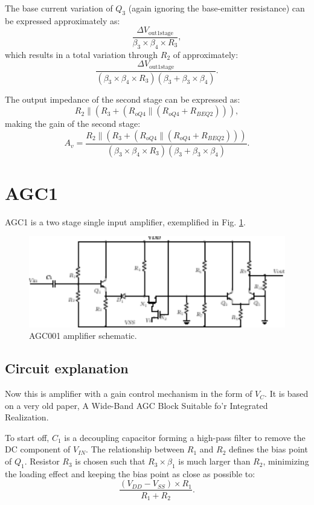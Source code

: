 \documentclass[12pt]{article}
\begin{document}
The base current variation of $Q_3$ (again ignoring the base-emitter resistance) can be expressed approximately as:  
\[
\frac{\Delta V_{\text{out1stage}}}{\beta_3 \times \beta_4 \times R_3},
\]  
which results in a total variation through $R_2$ of approximately:  
\[
\frac{\Delta V_{\text{out1stage}}}{(\beta_3 \times \beta_4 \times R_3)(\beta_3 + \beta_3 \times \beta_4)}.
\]  

The output impedance of the second stage can be expressed as:  
\[
R_2 \parallel \left(R_3 + \left(R_{oQ4} \parallel \left(R_{oQ4} + R_{BEQ2}\right)\right)\right),
\]  
making the gain of the second stage:  
\[
A_v = \frac{R_2 \parallel \left(R_3 + \left(R_{oQ4} \parallel \left(R_{oQ4} + R_{BEQ2}\right)\right)\right)}{(\beta_3 \times \beta_4 \times R_3)(\beta_3 + \beta_3 \times \beta_4)}.
\]


\section{AGC1}

AGC1 is a  two stage single input amplifier, exemplified in Fig. \ref{audio004}. 
\begin{figure}[H]
        \centering
        \includegraphics[width=1\textwidth]{audio004.pdf}
        \caption{AGC001 amplifier schematic.}
        \label{audio004}
\end{figure}
\subsection{Circuit explanation}
Now this is amplifier with a gain control mechanism in the form of $V_C$. It is based on a very old paper, A Wide-Band AGC Block Suitable fo’r Integrated Realization. 

To start off, $C_1$ is a decoupling capacitor forming a high-pass filter to remove the DC component of $V_{IN}$. The relationship between $R_1$ and $R_2$ defines the bias point of $Q_1$. Resistor $R_3$ is chosen such that $R_3 \times \beta_1$ is much larger than $R_2$, minimizing the loading effect and keeping the bias point as close as possible to:  
\[
\frac{(V_{DD} - V_{SS}) \times R_1}{R_1 + R_2}.
\]  
\end{document}
